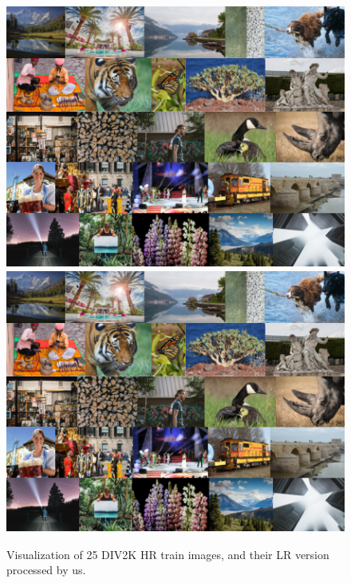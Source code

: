 \documentclass{article}
\begin{document}
{        \begin{figure}[ht]
            \centering
            \includegraphics[width=\textwidth]{images/DIV2K_HR.png}
            \includegraphics[width=\textwidth]{images/DIV2K_HR.png}
            \caption{Visualization of 25 DIV2K HR train images, and their LR version processed by us.}
            \label{fig:div2k-train}
        \end{figure}

}
\end{document}

